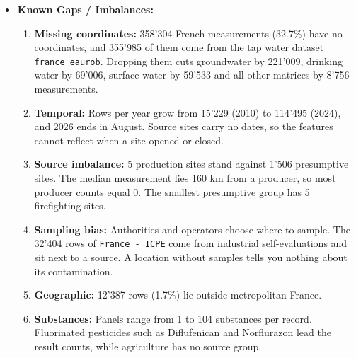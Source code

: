 \documentclass[11pt, a4paper]{article}
\newcommand{\code}[1]{\texttt{#1}}
\begin{document}
\begin{itemize}
    \item \textbf{Known Gaps / Imbalances:}
    \begin{enumerate}
        \item \textbf{Missing coordinates:} 358'304 French measurements (32.7\%) have no coordinates, and 355'985 of them come from the tap water dataset \code{france\_eaurob}. Dropping them cuts groundwater by 221'009, drinking water by 69'006, surface water by 59'533 and all other matrices by 8'756 measurements.
        \item \textbf{Temporal:} Rows per year grow from 15'229 (2010) to 114'495 (2024), and 2026 ends in August. Source sites carry no dates, so the features cannot reflect when a site opened or closed.
        \item \textbf{Source imbalance:} 5 production sites stand against 1'506 presumptive sites. The median measurement lies 160 km from a producer, so most producer counts equal 0. The smallest presumptive group has 5 firefighting sites.
        \item \textbf{Sampling bias:} Authorities and operators choose where to sample. The 32'404 rows of \code{France - ICPE} come from industrial self-evaluations and sit next to a source. A location without samples tells you nothing about its contamination.
        \item \textbf{Geographic:} 12'387 rows (1.7\%) lie outside metropolitan France.
        \item \textbf{Substances:} Panels range from 1 to 104 substances per record. Fluorinated pesticides such as Diflufenican and Norflurazon lead the result counts, while agriculture has no source group.
    \end{enumerate}
\end{itemize}

\end{document}
